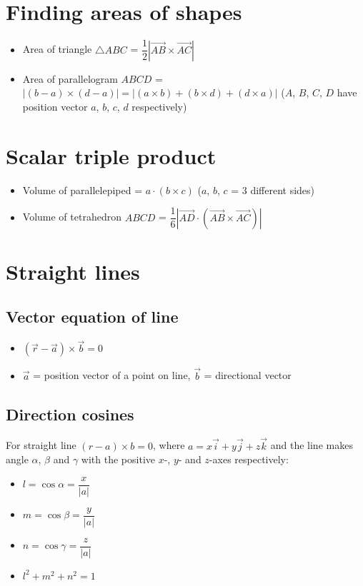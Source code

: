 \section{Finding areas of shapes}
\begin{itemize}
    \item Area of triangle $\bigtriangleup ABC$ = $\dfrac{1}{2}|\overrightarrow{AB}\times\overrightarrow{AC}|$
    \item Area of parallelogram $ABCD$ = $|(b-a) \times (d-a)|=|(a\times b)+(b \times d) + (d \times a)|$ ($A$, $B$, $C$, $D$ have position vector $a$, $b$, $c$, $d$ respectively)
\end{itemize}
\section{Scalar triple product}
\begin{itemize}
    \item Volume of parallelepiped = $a\cdot(b\times c)$ ($a$, $b$, $c$ = 3 different sides)
    \item Volume of tetrahedron $ABCD$ = $\dfrac{1}{6}|\overrightarrow{AD}\cdot(\overrightarrow{AB}\times\overrightarrow{AC})|$
\end{itemize}
\section{Straight lines}
\subsection{Vector equation of line}
\begin{itemize}
    \item $(\vec{r}-\vec{a})\times\vec{b}=0$
    \item $\vec{a}$ = position vector of a point on line, $\vec{b}$ = directional vector
\end{itemize}
\subsection{Direction cosines}
For straight line $(r-a)\times b=0$, where $a=x\vec{i}+y\vec{j}+z\vec{k}$ and the line makes angle $\alpha$, $\beta$ and $\gamma$ with the positive $x$-, $y$- and $z$-axes respectively:
\begin{itemize}
    \item $l=\cos\alpha = \dfrac{x}{|a|}$
    \item $m=\cos\beta = \dfrac{y}{|a|}$
    \item $n=\cos\gamma = \dfrac{z}{|a|}$
    \item $l^2+m^2+n^2=1$
\end{itemize}